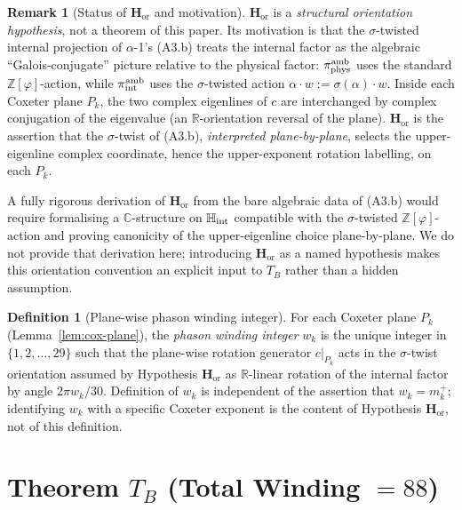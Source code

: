 \documentclass[11pt, a4paper]{amsart}
\theoremstyle{definition}
\newtheorem{definition}[theorem]{Definition}
\newtheorem{remark}[theorem]{Remark}
\newcommand{\R}{\mathbb{R}}
\newcommand{\C}{\mathbb{C}}
\newcommand{\HH}{\mathbb{H}}
\newcommand{\Hor}{\mathbf{H}_{\mathrm{or}}}
\newcommand{\Ophi}{\mathbb{Z}[\varphi]}
\begin{document}
\begin{remark}[Status of $\Hor$ and motivation]
\label{rmk:Horient-status}
$\Hor$ is a \emph{structural orientation hypothesis}, not a
theorem of this paper. Its motivation is that the
$\sigma$-twisted internal projection of $\alpha$-1's (A3.b)
treats the internal factor as the algebraic
``Galois-conjugate'' picture relative to the physical
factor: $\pi_{\rm phys}^{\rm amb}$ uses the standard
$\Ophi$-action, while $\pi_{\rm int}^{\rm amb}$ uses the
$\sigma$-twisted action $\alpha \cdot w := \sigma(\alpha)
\cdot w$. Inside each Coxeter plane $P_k$, the two complex
eigenlines of $c$ are interchanged by complex conjugation
of the eigenvalue (an $\R$-orientation reversal of the
plane). $\Hor$ is the assertion that the $\sigma$-twist of
(A3.b), \emph{interpreted plane-by-plane}, selects the
upper-eigenline complex coordinate, hence the upper-exponent
rotation labelling, on each $P_k$.

A fully rigorous derivation of $\Hor$ from the bare
algebraic data of (A3.b) would require formalising a
$\C$-structure on $\HH_{\rm int}$ compatible with the
$\sigma$-twisted $\Ophi$-action and proving canonicity of
the upper-eigenline choice plane-by-plane. We do not provide
that derivation here; introducing $\Hor$ as a named
hypothesis makes this orientation convention an explicit
input to $T_B$ rather than a hidden assumption.
\end{remark}

\begin{definition}[Plane-wise phason winding integer]
\label{def:winding}
For each Coxeter plane $P_k$ (Lemma~\ref{lem:cox-plane}), the
\emph{phason winding integer} $w_k$ is the unique integer
in $\{1, 2, \ldots, 29\}$ such that the plane-wise rotation
generator $c|_{P_k}$ acts in the $\sigma$-twist orientation
assumed by Hypothesis $\Hor$ as $\R$-linear rotation of the
internal factor by angle $2\pi w_k / 30$. Definition of $w_k$
is independent of the assertion that $w_k = m_k^+$; identifying
$w_k$ with a specific Coxeter exponent is the content of
Hypothesis $\Hor$, not of this definition.
\end{definition}

\section{Theorem $T_B$ (Total Winding $= 88$)}
\label{sec:TB-88}
\end{document}
